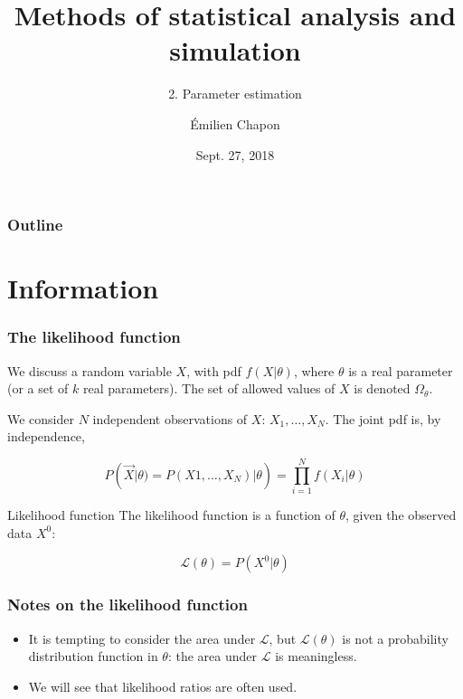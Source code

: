 \documentclass[9pt]{beamer}
\date[Stat2]{Sept. 27, 2018}
\title{Methods of statistical analysis and simulation}
\subtitle{2. Parameter estimation}
\author[E. Chapon]{Émilien Chapon}
\newif\ifmyhide
\newcommand\myhide[1]{%
\ifmyhide \vspace{15pt} \begin{center} \myexample{(blackboard)}\end{center} \vspace{15pt} \else #1 \fi
}
\begin{document}
{

\begin{frame}
 \maketitle
 
\end{frame}
}



\begin{frame}
 \frametitle{Outline}
 
 \tableofcontents
\end{frame}

\section{Information}

\begin{frame}
 \frametitle{The likelihood function}
 
 
 We discuss a random variable $X$, with pdf $f(X|\theta)$, where $\theta$ is a real parameter (or a set of $k$ real parameters).
 The set of allowed values of $X$ is denoted $\Omega_\theta$.
 
\myhide{
 We consider $N$ independent observations of $X$: $X_1,\dots,X_N$. The joint pdf is, by independence,
 
 $$P(\vec{X}|\theta) = P(X1,\dots,X_N)|\theta) = \prod_{i=1}^N f(X_i|\theta)$$
 
 \begin{block}{Likelihood function}
  The likelihood function is a function of $\theta$, given the observed data $X^0$:
  
  $$\mathcal{L}(\theta) = P(X^0|\theta)$$
 \end{block}
 
}
  
\end{frame}

\begin{frame}
 \frametitle{Notes on the likelihood function}
 
 \begin{itemize}
  \item It is tempting to consider the area under $\mathcal{L}$, but $\mathcal{L}(\theta)$ is not a probability distribution function in $\theta$: \alert{the area under $\mathcal{L}$ is meaningless}.
  \item We will see that likelihood ratios are often used.
 \end{itemize}


\end{frame}
\end{document}
